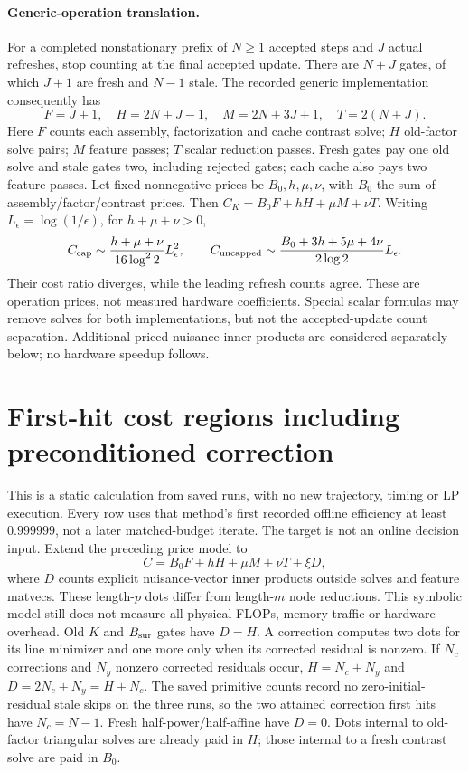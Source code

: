 \paragraph{Generic-operation translation.}
For a completed nonstationary prefix of $N\ge1$ accepted steps and $J$ actual refreshes, stop counting at the final accepted update.
There are $N+J$ gates, of which $J+1$ are fresh and $N-1$ stale.
The recorded generic implementation consequently has
\[
 F=J+1,\quad H=2N+J-1,\quad M=2N+3J+1,\quad T=2(N+J).
\]
Here $F$ counts each assembly, factorization and cache contrast solve; $H$ old-factor solve pairs; $M$ feature passes; $T$ scalar reduction passes.
Fresh gates pay one old solve and stale gates two, including rejected gates; each cache also pays two feature passes.
Let fixed nonnegative prices be $B_0,h,\mu,\nu$, with $B_0$ the sum of assembly/factor/contrast prices. Then $C_K=B_0F+hH+\mu M+\nu T$.
Writing $L_\epsilon=\log(1/\epsilon)$, for $h+\mu+\nu>0$,
\[
 C_{\rm cap}\sim\frac{h+\mu+\nu}{16\log^2 2}L_\epsilon^2,\qquad
 C_{\rm uncapped}\sim\frac{B_0+3h+5\mu+4\nu}{2\log2}L_\epsilon.
\]
Their cost ratio diverges, while the leading refresh counts agree.
These are operation prices, not measured hardware coefficients.
Special scalar formulas may remove solves for both implementations, but not the accepted-update count separation.
Additional priced nuisance inner products are considered separately below; no hardware speedup follows.

\section{First-hit cost regions including preconditioned correction}
This is a static calculation from saved runs, with no new trajectory, timing or LP execution. Every row uses that method's first recorded offline efficiency at least $0.999999$, not a later matched-budget iterate. The target is not an online decision input.
Extend the preceding price model to
\[
 C=B_0F+hH+\mu M+\nu T+\xi D,
\]
where $D$ counts explicit nuisance-vector inner products outside solves and feature matvecs. These length-$p$ dots differ from length-$m$ node reductions. This symbolic model still does not measure all physical FLOPs, memory traffic or hardware overhead.
Old $K$ and $B_{\rm sur}$ gates have $D=H$. A correction computes two dots for its line minimizer and one more only when its corrected residual is nonzero. If $N_c$ corrections and $N_y$ nonzero corrected residuals occur, $H=N_c+N_y$ and $D=2N_c+N_y=H+N_c$.
The saved primitive counts record no zero-initial-residual stale skips on the three runs, so the two attained correction first hits have $N_c=N-1$. Fresh half-power/half-affine have $D=0$. Dots internal to old-factor triangular solves are already paid in $H$; those internal to a fresh contrast solve are paid in $B_0$.

